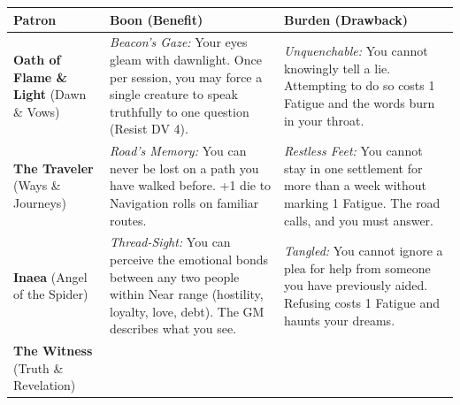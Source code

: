 \begin{longtable}{@{}p{3.2cm}p{4.8cm}p{4.8cm}@{}}
\toprule
\textbf{Patron} & \textbf{Boon (Benefit)} & \textbf{Burden (Drawback)} \\
\midrule
\endhead
\bottomrule
\endfoot
\textbf{Oath of Flame \& Light} (Dawn \& Vows) &
\begin{minipage}[t]{4.8cm}
\vspace{0pt}
\textit{Beacon's Gaze:} Your eyes gleam with dawnlight. Once per session, you may force a single creature to speak truthfully to one question (Resist DV 4).
\end{minipage} &
\begin{minipage}[t]{4.8cm}
\vspace{0pt}
\textit{Unquenchable:} You cannot knowingly tell a lie. Attempting to do so costs 1 Fatigue and the words burn in your throat.
\end{minipage} \\
\midrule
\textbf{The Traveler} (Ways \& Journeys) &
\begin{minipage}[t]{4.8cm}
\vspace{0pt}
\textit{Road's Memory:} You can never be lost on a path you have walked before. +1 die to Navigation rolls on familiar routes.
\end{minipage} &
\begin{minipage}[t]{4.8cm}
\vspace{0pt}
\textit{Restless Feet:} You cannot stay in one settlement for more than a week without marking 1 Fatigue. The road calls, and you must answer.
\end{minipage} \\
\midrule
\textbf{Inaea} (Angel of the Spider) &
\begin{minipage}[t]{4.8cm}
\vspace{0pt}
\textit{Thread-Sight:} You can perceive the emotional bonds between any two people within Near range (hostility, loyalty, love, debt). The GM describes what you see.
\end{minipage} &
\begin{minipage}[t]{4.8cm}
\vspace{0pt}
\textit{Tangled:} You cannot ignore a plea for help from someone you have previously aided. Refusing costs 1 Fatigue and haunts your dreams.
\end{minipage} \\
\midrule
\textbf{The Witness} (Truth \& Revelation) &
\begin{minipage}[t]{4.8cm}
\vspace{0pt}

\end{minipage}
\end{longtable}
